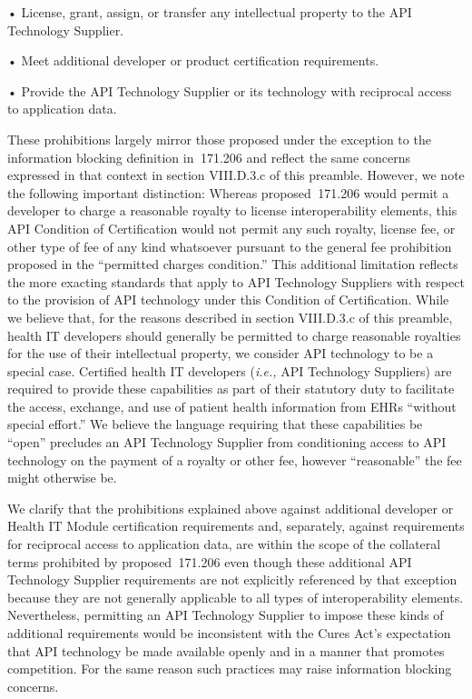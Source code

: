 \documentclass[twoside,11pt]{article}
\begin{document}
          • License, grant, assign, or transfer any intellectual property to the API Technology Supplier.


          • Meet additional developer or product certification requirements.


          • Provide the API Technology Supplier or its technology with reciprocal access to application data.



          These prohibitions largely mirror those proposed under the exception to the information blocking definition in \textsection{} 171.206 and reflect the same concerns expressed in that context in section VIII.D.3.c of this preamble. However, we note the following important distinction: Whereas proposed \textsection{} 171.206 would permit a developer to charge a reasonable royalty to license interoperability elements, this API Condition of Certification would not permit any such royalty, license fee, or other type of fee of any kind whatsoever pursuant to the general fee prohibition proposed in the “permitted charges condition.” This additional limitation reflects the more exacting standards that apply to API Technology Suppliers with respect to the provision of API technology under this Condition of Certification. While we believe that, for the reasons described in section VIII.D.3.c of this preamble, health IT developers should generally be permitted to charge reasonable royalties for the use of their intellectual property, we consider API technology to be a special case. Certified health IT developers (\emph{i.e.,} API Technology Suppliers) are required to provide these capabilities as part of their statutory duty to facilitate the access, exchange, and use of patient health information from EHRs “without special effort.” We believe the language requiring that these capabilities be “open” precludes an API Technology Supplier from conditioning access to API technology on the payment of a royalty or other fee, however “reasonable” the fee might otherwise be.


          We clarify that the prohibitions explained above against additional developer or Health IT Module certification requirements and, separately, against requirements for reciprocal access to application data, are within the scope of the collateral terms prohibited by proposed \textsection{} 171.206 even though these additional API Technology Supplier requirements are not explicitly referenced by that exception because they are not generally applicable to all types of interoperability elements. Nevertheless, permitting an API Technology Supplier to impose these kinds of additional requirements would be inconsistent with the Cures Act's expectation that API technology be made available openly and in a manner that promotes competition. For the same reason such practices may raise information blocking concerns.
\end{document}
